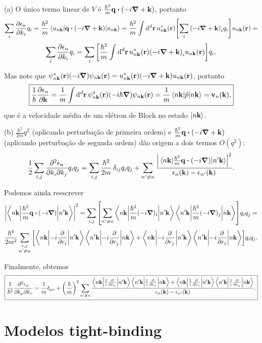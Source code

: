 \documentclass[a4paper,10pt]{article}
\begin{document}
\n

(a) O único termo linear de $V$ é $\frac{\hbar^2}{m} \q \vdot (-i\grad + \k)$, portanto
$$
\sum_{i} \pdv{\eps_n}{k_i} q_i = \frac{\hbar^2}{m} \ev{ \q \vdot (-i\grad + \k)}{u_{n\k}} =
\frac{\hbar^2}{m} \int \dd[d]{\r} u_{n\k}^*(\r) \qty[\sum_{i}\qty(-i\grad + \k)_i q_i] u_{n\k}(\r) =
$$
$$
\sum_{i} \pdv{\epsilon_n}{k_i} q_i =\sum_{i} \qty[\frac{\hbar^2}{m} \int \dd[d]{\vb{r}} u_{n\vb{k}}^*(\vb{r}) \qty(-i\grad + \vb{k})_i u_{n\vb{k}}(\vb{r}) ] q_i.
$$

Mas note que $\psi_{n\vb{k}}^*(\vb{r}) \qty(-i\grad) \psi_{n\vb{k}}(\vb{r}) = u_{n\vb{k}}^*(\vb{r}) \qty(-i\grad + \vb{k}) u_{n\vb{k}}(\vb{r})$, portanto
$$
\boxed{\frac{1}{\hbar} \pdv{\eps_n}{\k} = \frac{1}{m} \int \dd[d]{\r} \psi_{n\k}^*(\r) \qty(-i \hbar \grad) \psi_{n\k}(\r) =
\frac{1}{m} \ev{\hat{p}}{n\k} = \v_n(\k),}
$$
que é a velocidade média de um elétron de Bloch no estado $\ket{n\vb{k}}$.

\n

(b) $\frac{\hbar^2}{2m} q^2$ (aplicando perturbação de primeira ordem) e $\frac{\hbar^2}{m} \q \vdot (-i\grad + \k)$ (aplicando perturbação de segunda ordem) dão origem a dois termos $O(q^2)$:
$$
\frac{1}{2} \sum_{i,j} \pdv{\eps_n}{k_i}{k_j} q_i q_j =
\sum_{i,j} \frac{\hbar^2}{2m} \, \delta_{ij} q_i q_j +
\sum_{n' \neq n} \frac{\abs{\mel{n\k}{\frac{\hbar^2}{m} \q \vdot (-i\grad)}{n'\k}}^2}{\eps_n(\k) - \eps_{n'}(\k)}.
$$

Podemos ainda reescrever
$$
\abs{\mel**{n\k}{\frac{\hbar^2}{m} \q \vdot (-i\grad)}{n'\k}}^2 =
\sum_{i,j} \qty[ \sum_{n'\neq n}
\mel**{n\k}{\frac{\hbar^2}{m} (-i\grad)_i}{n'\k} \mel**{n'\k}{\frac{\hbar^2}{m} (-i\grad)_j}{n\k} ] q_i q_j =
$$
$$
\frac{\hbar^4}{2 m^2} \sum_{\substack{i,j \\ n' \neq n}}
\qty[
\mel**{n\vb{k}}{-i\pdv{r_i}}{n'\vb{k}} \mel**{n'\vb{k}}{-i\pdv{r_j}}{n\vb{k}} +
\mel**{n\vb{k}}{-i\pdv{r_j}}{n'\vb{k}} \mel**{n'\vb{k}}{-i\pdv{r_i}}{n\vb{k}}
] q_i q_j.
$$

Finalmente, obtemos
$$
\boxed{\frac{1}{\hbar^2} \pdv{\epsilon_n}{k_\mu}{k_\nu} = \frac{1}{m} \delta_{\mu\nu} + \qty(\frac{\hbar}{m})^2 \sum_{n'\neq n}
\frac{
\mel**{n\vb{k}}{\frac{1}{i}\pdv{r_\mu}}{n'\vb{k}} \mel**{n'\vb{k}}{\frac{1}{i}\pdv{r_\nu}}{n\vb{k}} +
\mel**{n\vb{k}}{\frac{1}{i}\pdv{r_\nu}}{n'\vb{k}} \mel**{n'\vb{k}}{\frac{1}{i}\pdv{r_\mu}}{n\vb{k}}
}{\epsilon_n(\vb{k}) - \epsilon_{n'}(\vb{k})}.}
$$


\pagebreak

\section{Modelos tight-binding}
\end{document}
